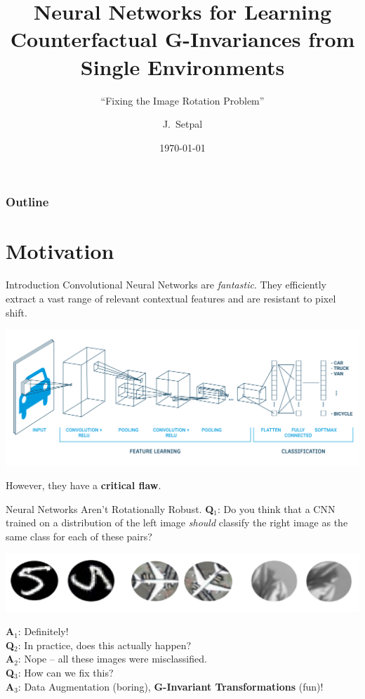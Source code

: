 \documentclass{beamer}
\title[G-Transformation Invaraiance]{Neural Networks for Learning Counterfactual G-Invariances from Single Environments}
\subtitle{``Fixing the Image Rotation Problem''}
\author[Machine Learning @ Purdue] %
{J.~Setpal}
\date{\today}
\begin{document}
\frame{\titlepage}

\begin{frame}
\frametitle{Outline}
\tableofcontents
\end{frame}


\section{Motivation}
\begin{frame}{Introduction}
	Convolutional Neural Networks are \textit{fantastic}. They efficiently extract a vast range of relevant contextual features and are resistant to pixel shift.

	\begin{center}
		\includegraphics[width=\textwidth]{img/cnn.png}
	\end{center}

	\pause
	However, they have a \textbf{critical flaw}.
\end{frame}

\begin{frame}{Neural Networks Aren't Rotationally Robust.}
	\textbf{Q}${}_1$: Do you think that a CNN trained on a distribution of the left image \textit{should} classify the right image as the same class for each of these pairs?
	\vspace{-.9em}
	\begin{center}
		\includegraphics[width=\textwidth]{img/rot.png}
	\end{center} 
	\pause
	\vspace{-1em}
	\textbf{A}${}_1$: Definitely! \pause \newline \\
	\textbf{Q}${}_2$: In practice, does this actually happen? \pause \\
	\textbf{A}${}_2$: Nope -- all these images were misclassified. \pause \newline \\
	\textbf{Q}${}_3$: How can we fix this? \pause \\
	\textbf{A}${}_3$: Data Augmentation (boring)\pause, \textbf{G-Invariant Transformations} (fun)!
\end{frame}
\end{document}
